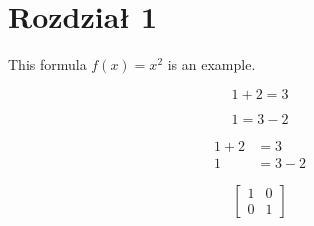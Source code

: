 \documentclass{article}
\begin{document}
  \section{Rozdział 1}

  This formula $f(x) = x^2$ is an example.

  \begin{equation}
    1 + 2 = 3 
  \end{equation}

  \begin{equation}
    1 = 3 - 2
  \end{equation}

  \begin{align}
    1 + 2 &= 3\\
    1 &= 3 - 2
  \end{align}

  \begin{equation}
    \left[
    \begin{matrix}
    1 & 0\\
    0 & 1
    \end{matrix}
    \right]
  \end{equation}
\end{document}
